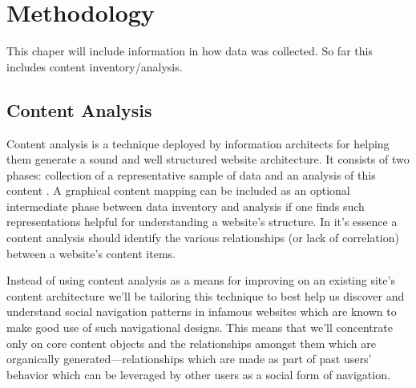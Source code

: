 \chapter{Methodology}
\label{chapter:methodology}

This chaper will include information in how data was collected. So far this
includes content inventory/analysis.

\section{Content Analysis}
Content analysis is a technique deployed by information architects for helping
them generate a sound and well structured website architecture. It consists of
two phases: collection of a representative sample of data and an analysis of
this content \citep[pp.~241--243]{morville06}.
A graphical content mapping can be included as an optional
intermediate phase between data inventory and analysis if one finds such
representations helpful for understanding a website's structure.
In it's essence a content analysis should identify the various
relationships (or lack of correlation) between a website's content items.

Instead of using content analysis as a means for improving on an existing
site's content architecture we'll be tailoring this technique to best help us
discover and understand social navigation patterns in infamous websites which
are known to make good use of such navigational designs. This means that we'll
concentrate only on core content objects and the relationships amongst them
which are organically generated---relationships which are made as part of
past users' behavior which can be leveraged by other users as a social form
of navigation.
